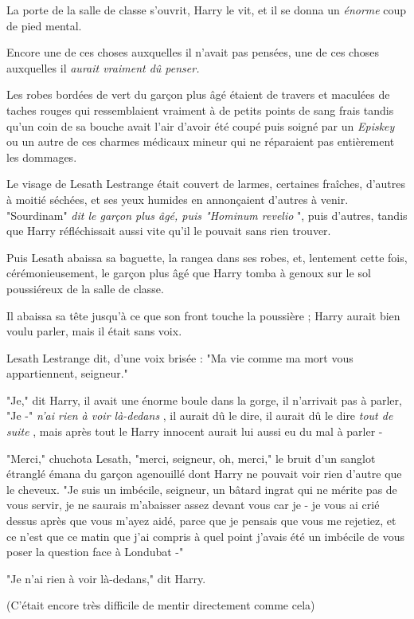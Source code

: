 La porte de la salle de classe s'ouvrit, Harry le vit, et il se donna un \emph{énorme}  coup de pied mental.

Encore une de ces choses auxquelles il n'avait pas pensées, une de ces choses auxquelles il \emph{aurait vraiment dû penser.} 

Les robes bordées de vert du garçon plus âgé étaient de travers et maculées de taches rouges qui ressemblaient vraiment à de petits points de sang frais tandis qu'un coin de sa bouche avait l'air d'avoir été coupé puis soigné par un \emph{Episkey}  ou un autre de ces charmes médicaux mineur qui ne réparaient pas entièrement les dommages.

Le visage de Lesath Lestrange était couvert de larmes, certaines fraîches, d'autres à moitié séchées, et ses yeux humides en annonçaient d'autres à venir. "Sourdinam"\emph{ dit le garçon plus âgé, puis "Hominum revelio} ", puis d'autres, tandis que Harry réfléchissait aussi vite qu'il le pouvait sans rien trouver.

Puis Lesath abaissa sa baguette, la rangea dans ses robes, et, lentement cette fois, cérémonieusement, le garçon plus âgé que Harry tomba à genoux sur le sol poussiéreux de la salle de classe.

Il abaissa sa tête jusqu'à ce que son front touche la poussière ; Harry aurait bien voulu parler, mais il était sans voix.

Lesath Lestrange dit, d'une voix brisée : "Ma vie comme ma mort vous appartiennent, seigneur."

"Je," dit Harry, il avait une énorme boule dans la gorge, il n'arrivait pas à parler, "Je -" \emph{n'ai rien à voir là-dedans} , il aurait dû le dire, il aurait dû le dire \emph{tout de suite} , mais après tout le Harry innocent aurait lui aussi eu du mal à parler -

"Merci," chuchota Lesath, "merci, seigneur, oh, merci," le bruit d'un sanglot étranglé émana du garçon agenouillé dont Harry ne pouvait voir rien d'autre que le cheveux. "Je suis un imbécile, seigneur, un bâtard ingrat qui ne mérite pas de vous servir, je ne saurais m'abaisser assez devant vous car je - je vous ai crié dessus après que vous m'ayez aidé, parce que je pensais que vous me rejetiez, et ce n'est que ce matin que j'ai compris à quel point j'avais été un imbécile de vous poser la question face à Londubat -"

"Je n'ai rien à voir là-dedans," dit Harry.

(C'était encore très difficile de mentir directement comme cela)

